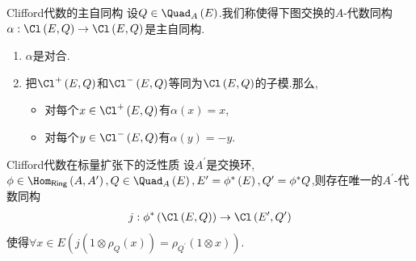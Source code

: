 \begin{definition}{Clifford代数的主自同构}{}
	设$Q\in\Quad_{A}\left(E\right)$.我们称使得下图交换的$A$-代数同构$\alpha:\Cl\left(E,Q\right)\to\Cl\left(E,Q\right)$是主自同构.
	\begin{center}
	\end{center}
\end{definition}

\begin{remark}{}{}
	\begin{enumerate}
		\item $\alpha$是对合.
		\item 把$\Cl^{+}\left(E,Q\right)$和$\Cl^{-}\left(E,Q\right)$等同为$\Cl\left(E,Q\right)$的子模.那么,
		\begin{itemize}
			\item 对每个$x\in\Cl^{+}\left(E,Q\right)$有$\alpha\left(x\right)=x$,
			\item 对每个$y\in\Cl^{-}\left(E,Q\right)$有$\alpha\left(y\right)=-y$.
		\end{itemize}
	\end{enumerate}
\end{remark}

\begin{proposition}{Clifford代数在标量扩张下的泛性质}{}
	设$A^{\prime}$是交换环,$\phi\in\Hom_{\mathsf{Ring}}\left(A,A^{\prime}\right),Q\in\Quad_{A}\left(E\right),E^{\prime}=\phi^{\ast}\left(E\right),Q^{\prime}=\phi^{\ast}Q$,则存在唯一的$A^{\prime}$-代数同构
	\begin{align*}
		j:\phi^{\ast}\left(\Cl\left(E,Q\right)\right)\to\Cl\left(E^{\prime},Q^{\prime}\right)
	\end{align*}
	使得$\forall x\in E\left(j\left(1\otimes\rho_{Q}\left(x\right)\right)=\rho_{Q^{\prime}}\left(1\otimes x\right)\right)$.
\end{proposition}





























